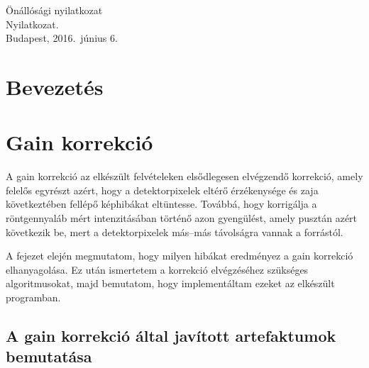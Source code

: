 \documentclass[a4paper,12pt,twoside]{article}
\begin{document}
\clearpage

{\large Önállósági nyilatkozat}
\\[0.5cm]


Nyilatkozat.\\[0.3cm]


Budapest, 2016.\ június 6.

\hspace{9cm}\makebox[1.5in]{\hrulefill}

\hspace{9cm}




\clearpage


 \tableofcontents

\clearpage

	






\section{Bevezetés}

\section{Gain korrekció}


A gain korrekció az elkészült felvételeken elsődlegesen elvégzendő korrekció, amely felelős egyrészt azért, hogy a detektorpixelek eltérő érzékenysége és zaja következtében fellépő képhibákat eltüntesse. Továbbá, hogy korrigálja a röntgennyaláb mért intenzitásában történő azon gyengülést, amely pusztán azért következik be, mert a detektorpixelek más--más távolságra vannak a forrástól.

A fejezet elején megmutatom, hogy milyen hibákat eredményez a gain korrekció elhanyagolása. Ez után ismertetem a korrekció elvégzéséhez szükséges algoritmusokat, majd bemutatom, hogy implementáltam ezeket az elkészült programban. 

\subsection{A gain korrekció által javított artefaktumok bemutatása}
\end{document}
